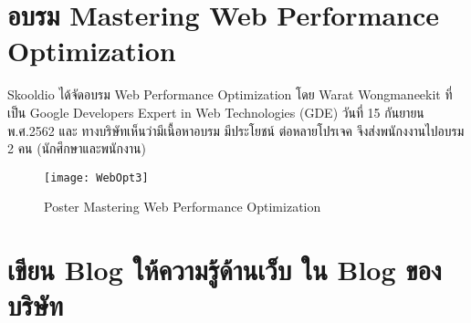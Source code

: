 \section{อบรม Mastering Web Performance Optimization}
Skooldio ได้จัดอบรม  Web Performance Optimization โดย Warat Wongmaneekit 
ที่เป็น Google Developers Expert in Web Technologies (GDE) วันที่ 15 กันยายน พ.ศ.2562 และ ทางบริษัทเห็นว่ามีเนื้อหาอบรม
มีประโยชน์ ต่อหลายโปรเจค จึงส่งพนักงงานไปอบรม 2 คน (นักศึกษาและพนักงาน)
\begin{figure}[]
	\centering
	\texttt{[image: WebOpt3]}
	\caption{Poster Mastering Web Performance Optimization}
	\label{Fig:WebPerformance}
\end{figure}

\section{เขียน Blog ให้ความรู้ด้านเว็บ ใน Blog ของบริษัท }
